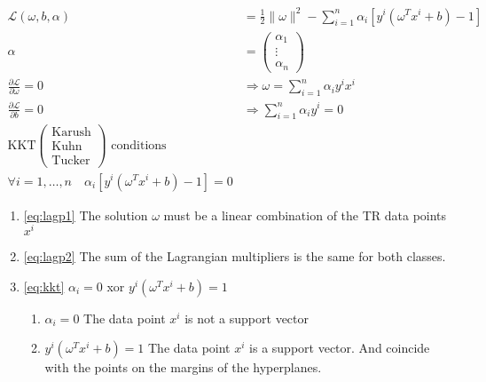 \begin{align*}
  \mathscr{L}(\omega, b, \alpha) &= \frac{1}{2}\lVert\omega\rVert^2 - \sum_{i=1}^n \alpha_i \left[ y^i(\omega^Tx^i + b) - 1 \right] \\
  \alpha &= \begin{pmatrix} \alpha_1 \\ \vdots \\ \alpha_n \end{pmatrix}
  \tag{Lagrangian multiplier} \\
  \frac{\partial \mathscr{L}}{\partial \omega} = 0 &\Rightarrow \omega = \sum_{i=1}^n \alpha_i y^i x^i \tag{p1}\label{eq:lagp1} \\
  \frac{\partial \mathscr{L}}{\partial b} = 0 &\Rightarrow \sum_{i=1}^n \alpha_i y^i = 0 \tag{p2}\label{eq:lagp2} \\
  \text{KKT} \begin{pmatrix}
  \text{Karush} \\
  \text{Kuhn} \\
  \text{Tucker}
\end{pmatrix} \text{ conditions} \\
\forall i=1,\dots,n \quad \alpha_i \left[ y^i(\omega^Tx^i + b) - 1 \right] = 0 \tag{kkt}\label{eq:kkt}
\end{align*}

\begin{enumerate}
  \item \ref{eq:lagp1} \textrightarrow{} The solution $\omega$ must be a linear combination of the TR data points $x^i$
  \item \ref{eq:lagp2} \textrightarrow{} The sum of the Lagrangian multipliers is the same for both classes.
  \item \ref{eq:kkt} \textrightarrow{} $\alpha_i = 0$  xor $y^i(\omega^Tx^i + b) = 1$
    \begin{enumerate}
      \item $\alpha_i = 0$ \textrightarrow{} The data point $x^i$ is not a support vector
      \item $y^i(\omega^Tx^i + b) = 1$ \textrightarrow{} The data point $x^i$ is a support vector. And coincide with the points on the margins of the hyperplanes.
    \end{enumerate}
\end{enumerate}
